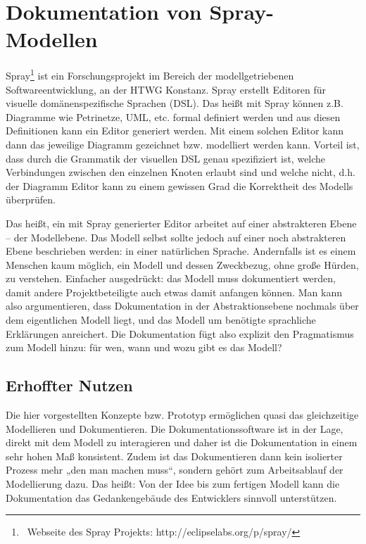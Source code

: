 \section{Dokumentation von Spray-Modellen}\label{doku-spray}
 
Spray\footnote{~Webseite des Spray Projekts: http://eclipselabs.org/p/spray/} ist ein Forschungsprojekt im Bereich der modellgetriebenen Softwareentwicklung, an der HTWG Konstanz. Spray erstellt Editoren für visuelle domänenspezifische Sprachen (DSL). Das heißt mit Spray können z.B. Diagramme wie Petrinetze, UML, etc. formal definiert werden und aus diesen Definitionen kann ein Editor generiert werden. Mit einem solchen Editor kann dann das jeweilige Diagramm gezeichnet bzw. modelliert werden kann. Vorteil ist, dass durch die Grammatik der visuellen DSL genau spezifiziert ist, welche Verbindungen zwischen den einzelnen Knoten erlaubt sind und welche nicht, d.h. der Diagramm Editor kann zu einem gewissen Grad die Korrektheit des Modells überprüfen.

 
Das heißt, ein mit Spray generierter Editor arbeitet auf einer abstrakteren Ebene -- der Modellebene. Das Modell selbst sollte jedoch auf einer noch abstrakteren Ebene beschrieben werden: in einer natürlichen Sprache. Andernfalls ist es einem Menschen kaum möglich, ein Modell und dessen Zweckbezug, ohne große Hürden, zu verstehen. Einfacher ausgedrückt: das Modell muss dokumentiert werden, damit andere Projektbeteiligte auch etwas damit anfangen können. Man kann also argumentieren, dass Dokumentation in der Abstraktionsebene nochmals über dem eigentlichen Modell liegt, und das Modell um benötigte sprachliche Erklärungen anreichert. Die Dokumentation fügt also explizit den Pragmatismus zum Modell hinzu: für wen, wann und wozu gibt es das Modell?

 
\subsection{Erhoffter Nutzen}\label{}
 
Die hier vorgestellten Konzepte bzw. Prototyp ermöglichen quasi das gleichzeitige Modellieren und Dokumentieren. Die Dokumentationssoftware ist in der Lage, direkt mit dem Modell zu interagieren und daher ist die Dokumentation in einem sehr hohen Maß konsistent. Zudem ist das Dokumentieren dann kein isolierter Prozess mehr „den man machen muss“, sondern gehört zum Arbeitsablauf der Modellierung dazu. Das heißt: Von der Idee bis zum fertigen Modell kann die Dokumentation das Gedankengebäude des Entwicklers sinnvoll unterstützen.

